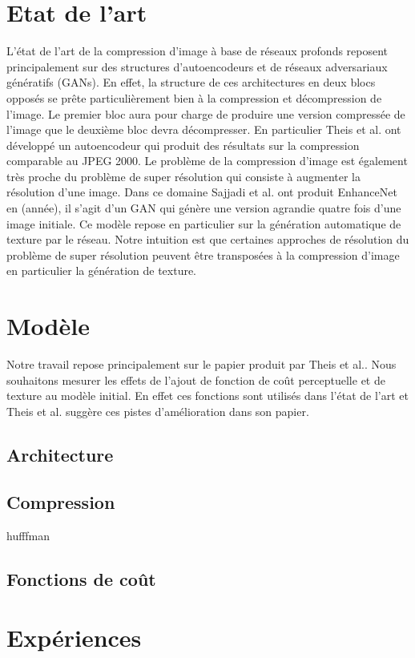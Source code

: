 \documentclass[10pt,twocolumn,letterpaper]{article}
\begin{document}
\section{Etat de l'art}
L'état de l'art de la compression d'image à base de réseaux profonds reposent principalement sur des structures d'autoencodeurs et de réseaux adversariaux génératifs (GANs). En effet, la structure de ces architectures en deux blocs opposés se prête particulièrement bien à la compression et décompression de l'image. Le premier bloc aura pour charge de produire une version compressée de l'image que le deuxième bloc devra décompresser. En particulier Theis et al. ont développé un autoencodeur qui produit des résultats sur la compression comparable au JPEG 2000. Le problème de la compression d'image est également très proche du problème de super résolution qui consiste à augmenter la résolution d'une image. Dans ce domaine Sajjadi et al. ont produit EnhanceNet en (année), il s'agit d'un GAN qui génère une version agrandie quatre fois d'une image initiale. Ce modèle repose en particulier sur la génération automatique de texture par le réseau. Notre intuition est que certaines approches de résolution du problème de super résolution peuvent être transposées à la compression d'image en particulier la génération de texture.

\section{Modèle}
Notre travail repose principalement sur le papier produit par Theis et al.. Nous souhaitons mesurer les effets de l'ajout de fonction de coût perceptuelle et de texture au modèle initial. En effet ces fonctions sont utilisés dans l'état de l'art et Theis et al. suggère ces pistes d'amélioration dans son papier.

\subsection{Architecture}
 
\subsection{Compression}
hufffman
\subsection{Fonctions de coût}



\section{Expériences}
\end{document}
